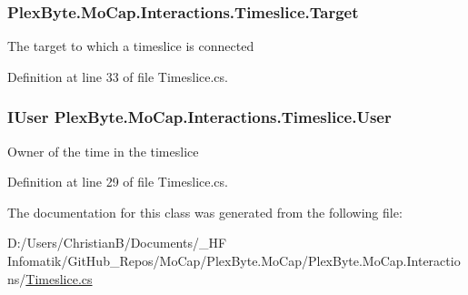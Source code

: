 \subsubsection[{\texorpdfstring{Target}{Target}}]{ Plex\+Byte.\+Mo\+Cap.\+Interactions.\+Timeslice.\+Target\hspace{0.3cm}{\ttfamily [get]}}\hypertarget{class_plex_byte_1_1_mo_cap_1_1_interactions_1_1_timeslice_a80b536958a41037922f51026651aafed}{}\label{class_plex_byte_1_1_mo_cap_1_1_interactions_1_1_timeslice_a80b536958a41037922f51026651aafed}


The target to which a timeslice is connected 



Definition at line 33 of file Timeslice.\+cs.

\subsubsection[{\texorpdfstring{User}{User}}]{\setlength{\rightskip}{0pt plus 5cm}I\+User Plex\+Byte.\+Mo\+Cap.\+Interactions.\+Timeslice.\+User\hspace{0.3cm}{\ttfamily [get]}}\hypertarget{class_plex_byte_1_1_mo_cap_1_1_interactions_1_1_timeslice_aa4ece3cd52590ebbf1c8b27756994a9d}{}\label{class_plex_byte_1_1_mo_cap_1_1_interactions_1_1_timeslice_aa4ece3cd52590ebbf1c8b27756994a9d}


Owner of the time in the timeslice 



Definition at line 29 of file Timeslice.\+cs.



The documentation for this class was generated from the following file\+:\begin{DoxyCompactItemize}
\item 
D\+:/\+Users/\+Christian\+B/\+Documents/\+\_\+\+H\+F Infomatik/\+Git\+Hub\+\_\+\+Repos/\+Mo\+Cap/\+Plex\+Byte.\+Mo\+Cap/\+Plex\+Byte.\+Mo\+Cap.\+Interactions/\hyperlink{_timeslice_8cs}{Timeslice.\+cs}\end{DoxyCompactItemize}
